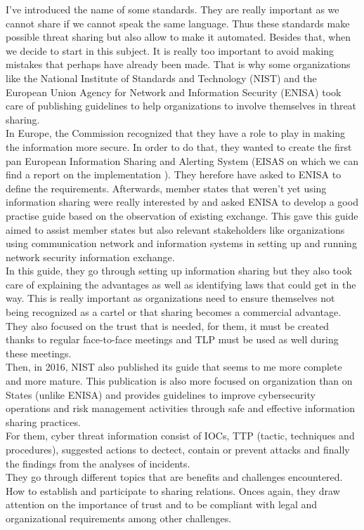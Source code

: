 \documentclass{eplmastersthesis}
\begin{document}
I've introduced the name of some standards. They are really important as we cannot share if we cannot speak the same language. Thus these standards make possible threat sharing but also allow to make it automated. Besides that, when we decide to start in this subject. It is really too important to avoid making mistakes that perhaps have already been made. That is why some organizations like the National Institute of Standards and Technology (NIST) and the European Union Agency for Network and Information Security (ENISA) took care of publishing guidelines to help organizations to involve themselves in threat sharing.\\
In Europe, the Commission recognized that they have a role to play in making the information more secure. In order to do that, they wanted to create the first pan European Information Sharing and Alerting System (EISAS on which we can find a report on the implementation \cite{eisasRapport}).  They herefore have asked to ENISA to define the requirements. Afterwards, member states that weren't yet using information sharing were really interested by and asked ENISA to develop a good practise guide based on the observation of existing exchange. This gave this guide \cite{enisaguide2009} aimed to assist member states but also relevant stakeholders like organizations using communication network and information systems in setting up and running network security information exchange.\\
In this guide, they go through setting up information sharing but they also took care of explaining the advantages as well as identifying laws that could get in the way. This is really important as organizations need to ensure themselves not being recognized as a cartel or that sharing becomes a commercial advantage. They also focused on the trust that is needed, for them, it must be created thanks to regular face-to-face meetings and TLP must be used as well during these meetings.\\
Then, in 2016, NIST also published its guide \cite{johnson2014guide} that seems to me more complete and more mature. This publication is also more focused on organization than on States (unlike ENISA) and provides guidelines to improve cybersecurity operations and risk management activities through safe and effective information sharing practices.\\
For them, cyber threat information consist of IOCs, TTP (tactic, techniques and procedures), suggested actions to dectect, contain or prevent attacks and finally the findings from the analyses of incidents. \\
They go through different topics that are benefits and challenges encountered. How to establish and participate to sharing relations. Onces again, they draw attention on the importance of trust and to be compliant with legal and organizational requirements among other challenges.\\
\end{document}
